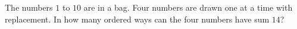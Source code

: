 The numbers $1$ to $10$ are in a bag. Four numbers are drawn one at a time with replacement. In how many ordered ways can the four numbers have sum $14$?
